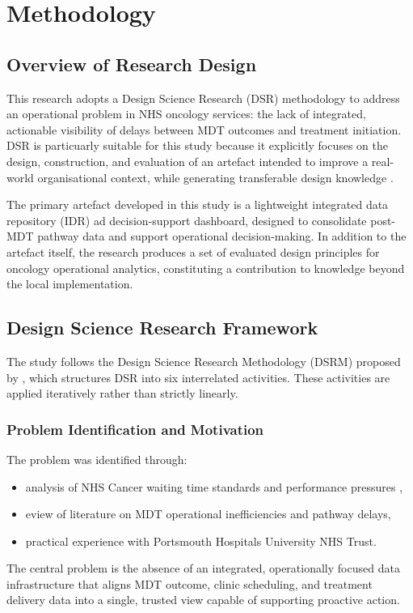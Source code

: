 \chapter{Methodology}

\section{Overview of Research Design}

This research adopts a Design Science Research (DSR) methodology to address an operational problem in NHS oncology services: the lack of integrated, actionable visibility of delays between MDT outcomes and treatment initiation. DSR is particuarly suitable for this study because it explicitly focuses on the design, construction, and evaluation of an artefact intended to improve a real-world organisational context, while generating transferable design knowledge \citep{hevner2004}.

The primary artefact developed in this study is a lightweight integrated data repository (IDR) ad decision-support dashboard, designed to consolidate post-MDT pathway data and support operational decision-making. In addition to the artefact itself, the research produces a set of evaluated design principles for oncology operational analytics, constituting a contribution to knowledge beyond the local implementation. 

\section{Design Science Research Framework}
The study follows the Design Science Research Methodology (DSRM) proposed by \cite{Peffers2007}, which structures DSR into six interrelated activities. These activities are applied iteratively rather than strictly linearly. 

\subsection{Problem Identification and Motivation}
The problem was identified through:
\begin{itemize}
    \item analysis of NHS Cancer waiting time standards and performance pressures \citep{johnson2024, NHSDigital2026},
    \item eview of literature on MDT operational inefficiencies and pathway delays,
    \item practical experience with Portsmouth Hospitals University NHS Trust.
\end{itemize}
The central problem is the absence of an integrated, operationally focused data infrastructure that aligns MDT outcome, clinic scheduling, and treatment delivery data into a single, trusted view capable of supporting proactive action. 

